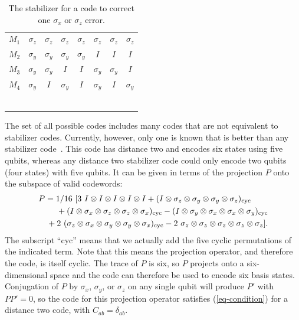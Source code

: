 \documentclass{report}
\newcommand{\X}{\sigma_x}
\newcommand{\Z}{\sigma_z}
\newcommand{\Y}{\sigma_y}
\newcommand{\Xbar}{\overline{X}}
\newcommand{\Zbar}{\overline{Z}}
\newcommand{\low}[1]{\raisebox{-0.3ex}{{#1}}}
\begin{document}
\begin{table}
\centering
\begin{tabular}{c|ccccccc}
$M_1$ & $\Z$ & $\Z$ & $\Z$ & $\Z$ & $\Z$ & $\Z$ & $\Z$ \\
$M_2$ & $\Y$ & $\Y$ & $\Y$ & $\Y$ & $I$ & $I$ & $I$ \\
$M_3$ & $\Y$ & $\Y$ & $I$ & $I$ & $\Y$ & $\Y$ & $I$ \\
$M_4$ & $\Y$ & $I$ & $\Y$ & $I$ & $\Y$ & $I$ & $\Y$ \\
\hline
\low{$\Xbar_1$} & \low{$\X$} & \low{$\X$} & \low{$I$} & \low{$I$} & \low{$I$} & 
\low{$I$} & \low{$\Z$} \\
\low{$\Xbar_2$} & \low{$\X$} & \low{$I$} & \low{$\X$} & \low{$I$} & \low{$I$} &
\low{$\Z$} & \low{$I$} \\
\low{$\Xbar_3$} & \low{$\X$} & \low{$I$} & \low{$I$} & \low{$\Z$} & \low{$\X$} &
\low{$I$} & \low{$I$} \\
\low{$\Zbar_1$} & \low{$I$} & \low{$\Z$} & \low{$I$} & \low{$\Z$} & \low{$I$} &
\low{$\Z$} & \low{$I$} \\
\low{$\Zbar_2$} & \low{$I$} & \low{$I$} & \low{$\Z$} & \low{$\Z$} & \low{$I$} &
\low{$I$} & \low{$\Z$} \\
\low{$\Zbar_3$} & \low{$I$} & \low{$I$} & \low{$I$} & \low{$I$} & \low{$\Z$} & 
\low{$\Z$} & \low{$\Z$}
\end{tabular}
\caption{The stabilizer for a code to correct one $\X$ or $\Z$ error.}
\label{table-XZcode}
\end{table}

The set of all possible codes includes many codes that are not equivalent
to stabilizer codes.  Currently, however, only one is known that is better
than any stabilizer code~\cite{rains-nonstab}.  This code has distance two
and encodes six states using five qubits, whereas any distance two stabilizer 
code could only encode two qubits (four states) with five qubits.  It can be 
given in terms of the projection $P$ onto the subspace of valid codewords:
\begin{eqnarray}
\lefteqn{P = 1/16\ [ 3\ I \otimes I \otimes I \otimes I \otimes I
+ (I \otimes \Z \otimes \Y \otimes \Y \otimes \Z)_{\rm cyc}} \nonumber \\
& & \mbox{} + (I \otimes \X \otimes \Z \otimes \Z \otimes \X)_{\rm cyc} 
- (I \otimes \Y \otimes \X \otimes \X \otimes \Y)_{\rm cyc} \\
& & \mbox{} + 2\ (\Z \otimes \X \otimes \Y \otimes \Y \otimes \X)_{\rm cyc}
- 2\ \Z \otimes \Z \otimes \Z \otimes \Z \otimes \Z ]. \nonumber
\end{eqnarray}
The subscript ``cyc'' means that we actually add the five cyclic permutations
of the indicated term.  Note that this means the projection operator, and
therefore the code, is itself cyclic.  The trace of $P$ is six, so $P$ projects
onto a six-dimensional space and the code can therefore be used to encode
six basis states.  Conjugation of $P$ by $\X$, $\Y$, or $\Z$ on any single 
qubit will produce $P'$ with $P P' = 0$, so the code for this projection 
operator satisfies (\ref{eq-condition}) for a distance two code, with $C_{ab} = 
\delta_{ab}$.
\end{document}
